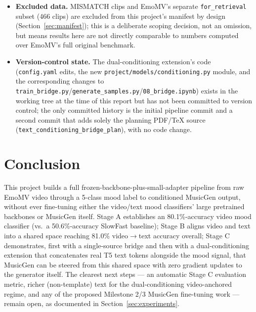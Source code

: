 \documentclass[11pt]{article}
\begin{document}
\begin{itemize}
  VideoMAE and CLIP streams beyond VideoMAE's own internal attention --- a clip's fine-grained
  temporal structure is not otherwise modeled.
  \item \textbf{Excluded data.} MISMATCH clips and EmoMV's separate \texttt{for\_retrieval} subset
  (466 clips) are excluded from this project's manifest by design (Section~\ref{sec:manifest}); this
  is a deliberate scoping decision, not an omission, but means results here are not directly
  comparable to numbers computed over EmoMV's full original benchmark.
  \item \textbf{Version-control state.} The dual-conditioning extension's code
  (\texttt{config.yaml} edits, the new \texttt{project/models/conditioning.py} module, and the
  corresponding changes to \texttt{train\_bridge.py}/\texttt{generate\_samples.py}/\texttt{08\_bridge.ipynb})
  exists in the working tree at the time of this report but has not been committed to version
  control; the only committed history is the initial pipeline commit and a second commit that adds
  solely the planning PDF/TeX source (\texttt{text\_conditioning\_bridge\_plan}), with no code
  change.
\end{itemize}

\section{Conclusion}
This project builds a full frozen-backbone-plus-small-adapter pipeline from raw EmoMV video through
a 5-class mood label to conditioned MusicGen output, without ever fine-tuning either the video/text
mood classifiers' large pretrained backbones or MusicGen itself. Stage A establishes an
80.1\%-accuracy video mood classifier (vs.\ a 50.6\%-accuracy SlowFast baseline); Stage B aligns
video and text into a shared space reaching 81.0\% video$\to$text accuracy overall; Stage C
demonstrates, first with a single-source bridge and then with a dual-conditioning extension that
concatenates real T5 text tokens alongside the mood signal, that MusicGen can be steered from this
shared space with zero gradient updates to the generator itself. The clearest next steps --- an
automatic Stage C evaluation metric, richer (non-template) text for the dual-conditioning
video-anchored regime, and any of the proposed Milestone 2/3 MusicGen fine-tuning work --- remain
open, as documented in Section~\ref{sec:experiments}.
\end{document}
